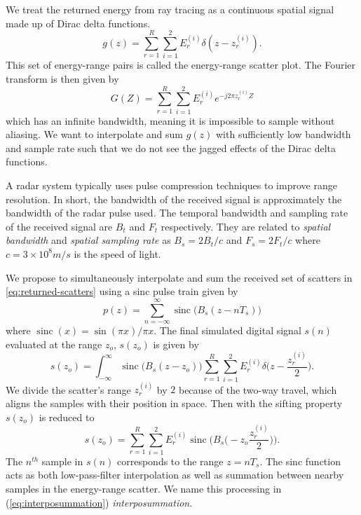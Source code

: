 \documentclass[onecolumn]{IEEEtran}
\DeclareMathOperator{\sinc}{sinc}
\begin{document}
We treat the returned energy from ray tracing as a continuous spatial signal made up of Dirac delta functions.
\begin{equation}
    g(z) = \sum_{r=1}^{R}\sum_{i=1}^{2}E_r^{(i)}\delta(z-z^{(i)}_r)
    .
    \label{eq:returned-scatters}
\end{equation}
This set of energy-range pairs is called the energy-range scatter plot. The Fourier transform is then given by
\begin{equation}
    G(Z) = \sum_{r=1}^{R}\sum_{i=1}^{2}E_r^{(i)}e^{- j 2 \pi z_r^{(i)} Z}
\end{equation}
which has an infinite bandwidth, meaning it is impossible to sample without aliasing. We want to interpolate and sum $g(z)$ with sufficiently low bandwidth and sample rate such that we do not see the jagged effects of the Dirac delta functions.



A radar system typically uses pulse compression techniques to improve range resolution. In short, the bandwidth of the received signal is approximately the bandwidth of the radar pulse used. The temporal bandwidth and sampling rate of the received signal are $B_t$ and $F_t$ respectively. They are related to \emph{spatial bandwidth} and \emph{spatial sampling rate} as $B_s = 2B_t/c$ and $F_s = 2F_t/c$ where $c=3\times10^8m/s$ is the speed of light.

We propose to simultaneously interpolate and sum the received set of scatters in \ref{eq:returned-scatters} using a sinc pulse train given by\begin{equation}
    p(z) = \sum_{n=-\infty}^{\infty}\sinc\big(B_s(z-nT_s)\big)
\end{equation}
where $\sinc(x) = \sin(\pi x)/\pi x$. The final simulated digital signal $s(n)$ evaluated at the range $z_o$, $s(z_o)$ is given by
\begin{equation}
    s(z_o) = \int_{-\infty}^{\infty}\sinc\big(B_s(z-z_o)\big)\sum_{r=1}^{R}\sum_{i=1}^{2}E_r^{(i)}\delta \bigg(z-\frac{z_r^{(i)}}{2} \bigg)
    .
\end{equation}
We divide the scatter's range $z_r^{(i)}$ by $2$ because of the two-way travel, which aligns the samples with their position in space. Then with the sifting property $s(z_o)$ is reduced to
\begin{equation}
    s(z_o) = \sum_{r=1}^{R}\sum_{i=1}^{2}E_r^{(i)}\sinc\Bigg(B_s\bigg(-z_o\frac{z_r^{(i)}}{2}\bigg)\Bigg)
    .
    \label{eq:interposummation}
\end{equation}
The $n^{th}$ sample in $s(n)$ corresponds to the range $z=nT_s$. The sinc function acts as both low-pass-filter interpolation as well as summation between nearby samples in the energy-range scatter. We name this processing in (\ref{eq:interposummation}) \emph{interposummation}.
\end{document}
